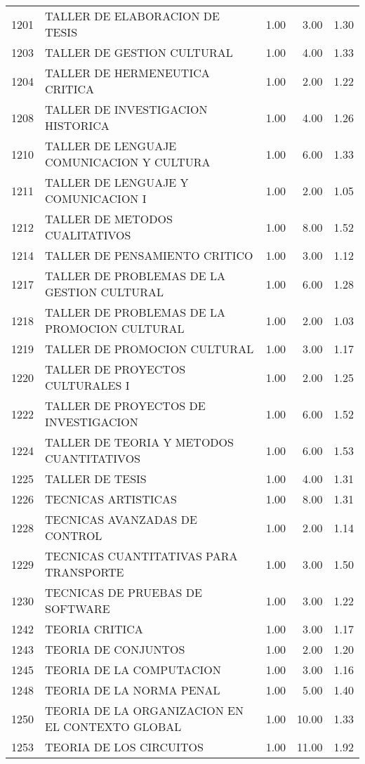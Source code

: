 \documentclass[12pt]{article}
\begin{document}
\begin{table}[ht]
\begin{tabular}{rlrrr}
  1201 & TALLER DE ELABORACION DE TESIS & 1.00 & 3.00 & 1.30 \\ 
  1203 & TALLER DE GESTION CULTURAL & 1.00 & 4.00 & 1.33 \\ 
  1204 & TALLER DE HERMENEUTICA CRITICA & 1.00 & 2.00 & 1.22 \\ 
  1208 & TALLER DE INVESTIGACION HISTORICA & 1.00 & 4.00 & 1.26 \\ 
  1210 & TALLER DE LENGUAJE COMUNICACION Y CULTURA & 1.00 & 6.00 & 1.33 \\ 
  1211 & TALLER DE LENGUAJE Y COMUNICACION I & 1.00 & 2.00 & 1.05 \\ 
  1212 & TALLER DE METODOS CUALITATIVOS & 1.00 & 8.00 & 1.52 \\ 
  1214 & TALLER DE PENSAMIENTO CRITICO & 1.00 & 3.00 & 1.12 \\ 
  1217 & TALLER DE PROBLEMAS DE LA GESTION CULTURAL & 1.00 & 6.00 & 1.28 \\ 
  1218 & TALLER DE PROBLEMAS DE LA PROMOCION CULTURAL & 1.00 & 2.00 & 1.03 \\ 
  1219 & TALLER DE PROMOCION CULTURAL & 1.00 & 3.00 & 1.17 \\ 
  1220 & TALLER DE PROYECTOS CULTURALES I & 1.00 & 2.00 & 1.25 \\ 
  1222 & TALLER DE PROYECTOS DE INVESTIGACION & 1.00 & 6.00 & 1.52 \\ 
  1224 & TALLER DE TEORIA Y METODOS CUANTITATIVOS & 1.00 & 6.00 & 1.53 \\ 
  1225 & TALLER DE TESIS & 1.00 & 4.00 & 1.31 \\ 
  1226 & TECNICAS ARTISTICAS & 1.00 & 8.00 & 1.31 \\ 
  1228 & TECNICAS AVANZADAS DE CONTROL & 1.00 & 2.00 & 1.14 \\ 
  1229 & TECNICAS CUANTITATIVAS PARA TRANSPORTE & 1.00 & 3.00 & 1.50 \\ 
  1230 & TECNICAS DE PRUEBAS DE SOFTWARE & 1.00 & 3.00 & 1.22 \\ 
  1242 & TEORIA CRITICA & 1.00 & 3.00 & 1.17 \\ 
  1243 & TEORIA DE CONJUNTOS & 1.00 & 2.00 & 1.20 \\ 
  1245 & TEORIA DE LA COMPUTACION & 1.00 & 3.00 & 1.16 \\ 
  1248 & TEORIA DE LA NORMA PENAL & 1.00 & 5.00 & 1.40 \\ 
  1250 & TEORIA DE LA ORGANIZACION EN EL CONTEXTO GLOBAL & 1.00 & 10.00 & 1.33 \\ 
  1253 & TEORIA DE LOS CIRCUITOS & 1.00 & 11.00 & 1.92 \\ 

\end{tabular}
\end{table}
\end{document}
